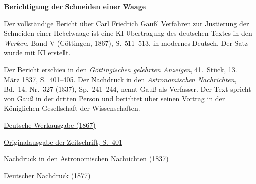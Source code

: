 \clearpage
\thispagestyle{empty}
\begin{center}\Large\textbf{Berichtigung der Schneiden einer Waage}\end{center}

Der vollständige Bericht über Carl Friedrich Gauß’ Verfahren zur Justierung der Schneiden einer Hebelwaage ist eine KI-Übertragung des deutschen Textes in den \textit{Werken}, Band V (Göttingen, 1867), S.~511--513, in modernes Deutsch. Der Satz wurde mit KI erstellt.

Der Bericht erschien in den \textit{Göttingischen gelehrten Anzeigen}, 41.~Stück, 13. März 1837, S.~401--405. Der Nachdruck in den \textit{Astronomischen Nachrichten}, Bd.~14, Nr.~327 (1837), Sp.~241--244, nennt Gauß als Verfasser. Der Text spricht von Gauß in der dritten Person und berichtet über seinen Vortrag in der Königlichen Gesellschaft der Wissenschaften.

\medskip\noindent
\href{https://gdz.sub.uni-goettingen.de/id/PPN236006339}{Deutsche Werkausgabe (1867)}\par
\noindent\href{https://api.digitale-sammlungen.de/iiif/image/v2/bsb10538714_00407/full/1150,/0/default.jpg}{Originalausgabe der Zeitschrift, S.~401}\par
\noindent\href{https://mctoon.net/wp-content/uploads/2019/12/astronomische-nachrichten-313-336.pdf\#page=141}{Nachdruck in den Astronomischen Nachrichten (1837)}\par
\noindent\href{https://doi.org/10.1007/978-3-642-49319-5_26}{Deutscher Nachdruck (1877)}
\clearpage
